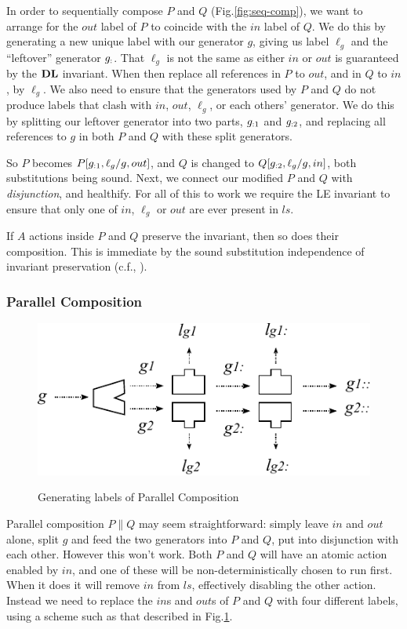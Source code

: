 In order to sequentially compose $P$ and $Q$ (Fig.\ref{fig:seq-comp}),
we want to arrange for the $out$ label of $P$
to coincide with the $in$ label of $Q$.
We do this by generating a new unique label with our generator $g$,
giving us label $\ell_g$ and the ``leftover'' generator $g_{:}$.
That $\ell_g$ is not the same as either $in$ or $out$
is guaranteed by the $\mathbf{DL}$ invariant.
When then replace all references in $P$ to $out$,
and in $Q$ to $in$, by $\ell_g$.
We also need to ensure that the generators used by $P$ and $Q$
do not produce labels that clash with $in$, $out$, $\ell_g$,
or each others' generator.
We do this by splitting our leftover generator into two parts,
$g_{:1}$ and $g_{:2}$,
and replacing all references to $g$ in both $P$ and $Q$
with these split generators.

So $P$ becomes $P[g_{:1},\ell_g/g,out]$,
and $Q$ is changed to $Q[g_{:2},\ell_g/g,in]$, both substitutions being sound.
Next, we connect our modified $P$ and $Q$ with \emph{disjunction},
and healthify.
For all of this to work we require the LE invariant
to ensure that only one of $in$, $\ell_g$ or $out$
are ever present in $ls$.

If $A$ actions inside $P$ and $Q$ preserve the invariant,
then so does their composition.
This is immediate by the sound substitution independence
of invariant preservation (c.f., ).



\newpage
\subsubsection{Parallel Composition}

\begin{figure}
  \centering
  \includegraphics{images/parallel-label-gen}\\
  \caption{Generating labels of Parallel Composition}
  \label{fig:par-lbl-gen}
\end{figure}
Parallel composition $P\parallel Q$ may seem straightforward:
simply leave $in$ and $out$ alone, split $g$ and feed the
two generators into $P$ and $Q$, put into disjunction with each other.
However this won't work. Both $P$ and $Q$ will
have an atomic action enabled by $in$,
and one of these will be non-deterministically chosen to run first.
When it does it will remove $in$ from $ls$,
effectively disabling the other action.
Instead we need to replace the $in$s and $out$s of $P$ and $Q$
with four different labels, using a scheme such as that described
in Fig.\ref{fig:par-lbl-gen}.

